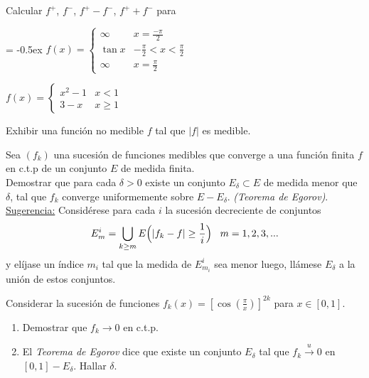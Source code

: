 \documentclass{book}
\begin{document}
\begin{ejer}{} 
Calcular $f^+$, $f^-$, $f^+-f^-$, $f^{+} + f^-$ para
\begin{enumerate}
\item 
{
\extrarowheight = -0.5ex
\renewcommand{\arraystretch}{1.5}
$f(x)=\left\{
\begin{array}{lc}
\infty&x=\frac{-\pi}{2}
\\
\tan x &-\frac{\pi}{2}<x<\frac{\pi}{2}
\\
\infty&x=\frac{\pi}{2}
\end{array}
\right.$
\item $f(x)=\left\{
\begin{array}{ll}
x^2-1&x<1
\\
3-x&x\geq 1
\end{array}
\right.$}
\end{enumerate}
\end{ejer}




\begin{ejer}{} 
Exhibir una función no medible $f$ tal que $|f|$ es medible.
\end{ejer}




\begin{ejer}{} 
Sea $(f_k)$ una sucesión de  funciones medibles que converge a una función finita $f$
en c.t.p de un conjunto $E$ de medida finita. 
\\
Demostrar que para cada $\delta>0$  existe un conjunto
$E_{\delta}\subset E$ de medida menor que $\delta$, tal que $f_k$ converge uniformemente sobre 
$E-E_{\delta}$. 
{\it{(Teorema de Egorov)}}.
\\
\underline{Sugerencia:} Considérese para cada $i$ la 
sucesión decreciente de conjuntos
$$E_m^i=\bigcup_{k\geq m}E\Bigl(|f_k-f|\geq \frac{1}{i}\Bigr) \;\;\;m=1,2,3,...$$
y elíjase un índice $m_i$ tal que la medida de $E_{m_i}^i$ sea menor luego, llámese $E_{\delta}$ a la unión de estos conjuntos.
\end{ejer} 

\begin{ejer}{} 
Considerar la sucesi\'on de funciones $f_k(x)=\left[\cos(\frac{\pi}{x})\right]^{2k}$ para $x \in [0,1]$.
\begin{enumerate}
\item Demostrar que $f_k \to 0$ en c.t.p.
\item El \textit{Teorema de Egorov} dice que existe un conjunto $E_{\delta}$ tal que $f_k \xrightarrow{u} 0$
en $[0,1]-E_{\delta}$. 
Hallar $\delta$.
\end{enumerate}
\end{ejer}
\end{document}
